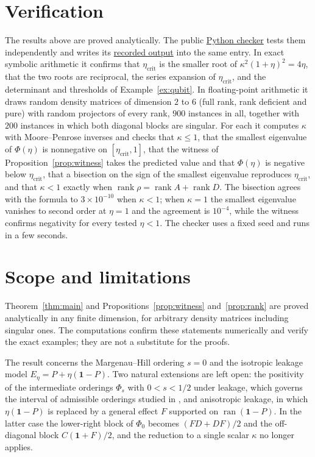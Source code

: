 \documentclass[11pt,a4paper]{article}
\theoremstyle{definition}
\theoremstyle{plain}
\DeclareMathOperator{\ran}{ran}
\DeclareMathOperator{\rank}{rank}
\newcommand{\one}{\mathbf{1}}
\newcommand{\etac}{\eta_{\mathrm{crit}}}
\begin{document}
\section{Verification}\label{sec:verification}
The results above are proved analytically. The public
\href{https://github.com/jpbruneton/open_quantum_problems/blob/main/research/entries/postselection-leakage-threshold/checks/verify_leakage_threshold.py}{Python checker}
tests them independently and writes its
\href{https://github.com/jpbruneton/open_quantum_problems/blob/main/research/entries/postselection-leakage-threshold/data/verification.json}{recorded output}
into the same entry. In exact symbolic arithmetic it confirms that $\etac$ is
the smaller root of $\kappa^2(1+\eta)^2=4\eta$, that the two roots are
reciprocal, the series expansion of $\etac$, and the determinant and
thresholds of Example~\ref{ex:qubit}. In floating-point arithmetic it draws
random density matrices of dimension $2$ to $6$ (full rank, rank deficient and
pure) with random projectors of every rank, $900$ instances in all, together
with $200$ instances in which both diagonal blocks are singular. For each it
computes $\kappa$ with Moore--Penrose inverses and checks that $\kappa\le1$,
that the smallest eigenvalue of $\Phi(\eta)$ is nonnegative on $[\etac,1]$,
that the witness of Proposition~\ref{prop:witness} takes the predicted value
and that $\Phi(\eta)$ is negative below $\etac$, that a bisection on the sign of
the smallest eigenvalue reproduces $\etac$, and that $\kappa<1$ exactly when
$\rank\rho=\rank A+\rank D$. The bisection agrees with the formula to
$3\times10^{-10}$ when $\kappa<1$; when $\kappa=1$ the smallest eigenvalue
vanishes to second order at $\eta=1$ and the agreement is $10^{-4}$, while the
witness confirms negativity for every tested $\eta<1$. The checker uses a fixed
seed and runs in a few seconds.

\section{Scope and limitations}\label{sec:scope}
Theorem~\ref{thm:main} and Propositions~\ref{prop:witness}
and~\ref{prop:rank} are proved analytically in any finite dimension, for
arbitrary density matrices including singular ones. The computations confirm
these statements numerically and verify the exact examples; they are not a
substitute for the proofs.

The result concerns the Margenau--Hill ordering $s=0$ and the isotropic
leakage model $E_\eta=P+\eta(\one-P)$. Two natural extensions are left open:
the positivity of the intermediate orderings $\Phi_s$ with $0<s<1/2$ under
leakage, which governs the interval of admissible orderings studied in
\cite{KamWong2026}, and anisotropic leakage, in which $\eta(\one-P)$ is
replaced by a general effect $F$ supported on $\ran(\one-P)$. In the latter
case the lower-right block of $\Phi_0$ becomes $(FD+DF)/2$ and the off-diagonal
block $C(\one+F)/2$, and the reduction to a single scalar $\kappa$ no longer
applies.
\end{document}
